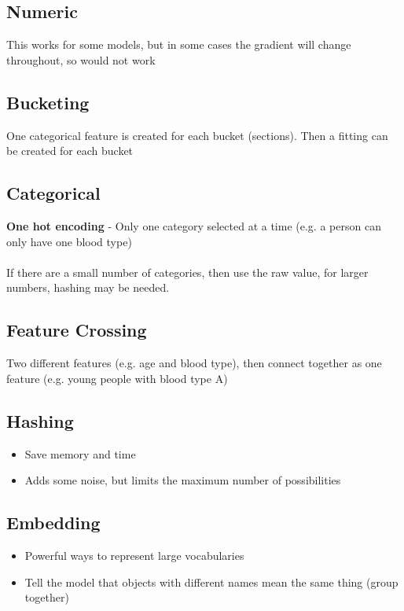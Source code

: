 \documentclass{article}[18pt]
\begin{document}
\subsection{Numeric}
This works for some models, but in some cases the gradient will change throughout, so would not work
\subsection{Bucketing}
One categorical feature is created for each bucket (sections). Then a fitting can be created for each bucket
\subsection{Categorical}
\textbf{One hot encoding} - Only one category selected at a time (e.g. a person can only have one blood type)\\
\\
If there are a small number of categories, then use the raw value, for larger numbers, hashing may be needed.
\subsection{Feature Crossing}
Two different features (e.g. age and blood type), then connect together as one feature (e.g. young people with blood type A)
\subsection{Hashing}
\begin{itemize}
	\item Save memory and time
	\item Adds some noise, but limits the maximum number of possibilities
\end{itemize}
\subsection{Embedding}
\begin{itemize}
	\item Powerful ways to represent large vocabularies
	\item Tell the model that objects with different names mean the same thing (group together)
\end{itemize}
\end{document}
